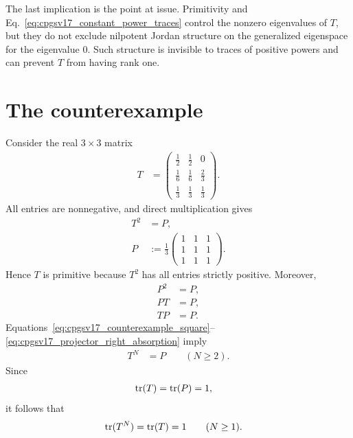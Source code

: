 \documentclass{article}
\begin{document}
The last implication is the point at issue. Primitivity and
Eq.~\ref{eq:cpgsv17_constant_power_traces} control the nonzero eigenvalues of
$T$, but they do not exclude nilpotent Jordan structure on the generalized
eigenspace for the eigenvalue $0$. Such structure is invisible to traces of
positive powers and can prevent $T$ from having rank one.

\section{The counterexample}
\label{sec:cpgsv17_counterexample}

Consider the real $3\times 3$ matrix
\begin{align}
    T
        &=
        \begin{pmatrix}
            \tfrac12 & \tfrac12 & 0\\
            \tfrac16 & \tfrac16 & \tfrac23\\
            \tfrac13 & \tfrac13 & \tfrac13
        \end{pmatrix}.
    \label{eq:cpgsv17_counterexample_matrix}
\end{align}
All entries are nonnegative, and direct multiplication gives
\begin{align}
    T^2
        &= P,
    \label{eq:cpgsv17_counterexample_square}\\
    P
        &:= \frac13
        \begin{pmatrix}
            1&1&1\\
            1&1&1\\
            1&1&1
        \end{pmatrix}.
    \label{eq:cpgsv17_perron_projector}
\end{align}
Hence $T$ is primitive because $T^2$ has all entries strictly positive.
Moreover,
\begin{align}
    P^2
        &= P,
    \label{eq:cpgsv17_projector_idempotence}\\
    PT
        &= P,
    \label{eq:cpgsv17_projector_left_absorption}\\
    TP
        &= P.
    \label{eq:cpgsv17_projector_right_absorption}
\end{align}
Equations~\ref{eq:cpgsv17_counterexample_square}--%
\ref{eq:cpgsv17_projector_right_absorption} imply
\begin{align}
    T^N
        &= P
        \qquad (N\geq 2).
    \label{eq:cpgsv17_counterexample_power_stabilization}
\end{align}
Since
\begin{align}
    \operatorname{tr}(T)
        &= \operatorname{tr}(P)
         = 1,
    \label{eq:cpgsv17_counterexample_trace_one}
\end{align}
it follows that
\begin{align}
    \operatorname{tr}(T^N)
        &= \operatorname{tr}(T)
         = 1
        \qquad (N\geq 1).
    \label{eq:cpgsv17_counterexample_constant_traces}
\end{align}
\end{document}
